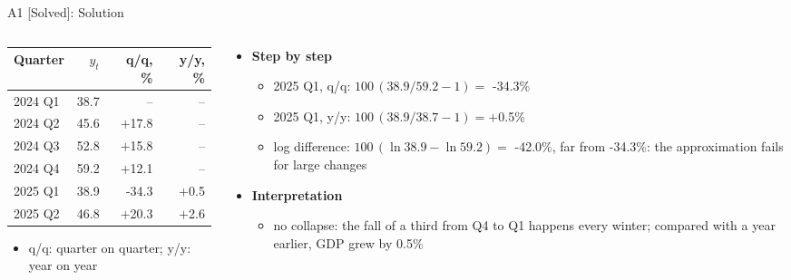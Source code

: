 \begin{frame}{A1 [Solved]: Solution}
\itemsize{\footnotesize}
\begin{columns}[T]
\begin{column}{0.42\textwidth}
\begin{center}
\footnotesize
\begin{tabular}{lrrr}
\toprule
Quarter & $y_t$ & q/q, \% & y/y, \% \\
\midrule
2024 Q1 & 38.7 & -- & -- \\
2024 Q2 & 45.6 & $+$17.8 & -- \\
2024 Q3 & 52.8 & $+$15.8 & -- \\
2024 Q4 & 59.2 & $+$12.1 & -- \\
2025 Q1 & 38.9 & -34.3 & $+$0.5 \\
2025 Q2 & 46.8 & $+$20.3 & $+$2.6 \\
\bottomrule
\end{tabular}
\end{center}
\begin{itemize}
    \item q/q: quarter on quarter; y/y: year on year
\end{itemize}
\end{column}
\begin{column}{0.55\textwidth}
\begin{itemize}
    \item \textbf{Step by step}
    \begin{itemize}
        \item 2025 Q1, q/q: $100\,(38.9/59.2 - 1) = $ -34.3\%
        \item 2025 Q1, y/y: $100\,(38.9/38.7 - 1) = +$0.5\%
        \item log difference: $100\,(\ln 38.9 - \ln 59.2) = $ -42.0\%, far from -34.3\%: the approximation fails for large changes
    \end{itemize}
    \item \textbf{Interpretation}
    \begin{itemize}
        \item no collapse: the fall of a third from Q4 to Q1 happens every winter; compared with a year earlier, GDP grew by 0.5\%
    \end{itemize}
\end{itemize}
\end{column}
\end{columns}
\end{frame}

